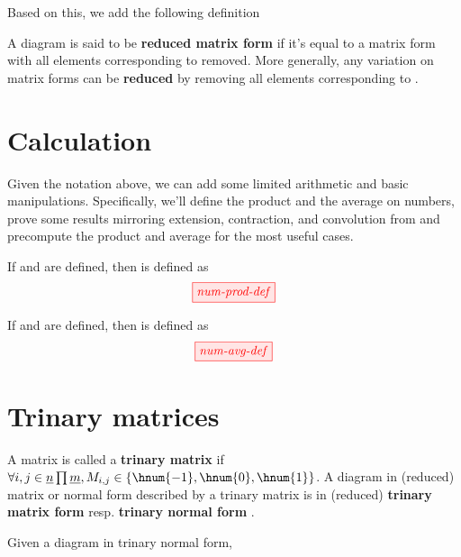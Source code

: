 Based on this, we add the following definition
\begin{definition}
    A diagram is said to be \textbf{reduced matrix form} if it's equal to a
    matrix form with all elements corresponding to  removed. More
    generally, any variation on matrix forms can be \textbf{reduced} by removing
    all elements corresponding to .
\end{definition}

\section{Calculation}\label{sec:calculation}
Given the notation above, we can add some limited arithmetic and basic
manipulations. Specifically, we'll define the product and the average on
numbers, prove some results mirroring extension, contraction, and convolution
from \cite{backens2018zhcalculus} and precompute the product and average for the
most useful cases.

\begin{definition}
    If  and  are defined, then  is defined as
    $$\tikzfig{num-prod-def}$$
\end{definition}

\begin{definition}
    If  and  are defined, then  is defined as
    $$\tikzfig{num-avg-def}$$
\end{definition}


\section{Trinary matrices}

\begin{definition}
    A matrix  is called a \textbf{trinary matrix} if%
    $\forall i,j \in \underline{n} \prod \underline{m}, M_{i,j} \in \{\hnum{-1},%
    \hnum{0},\hnum{1}\}$. A diagram in (reduced) matrix or normal form described
    by a trinary matrix is in (reduced) \textbf{trinary matrix form} resp.
    \textbf{trinary normal form} .
\end{definition}

\begin{lemma}\label{lem:extclosed}
    Given a diagram  in trinary normal form, 
\end{lemma}

